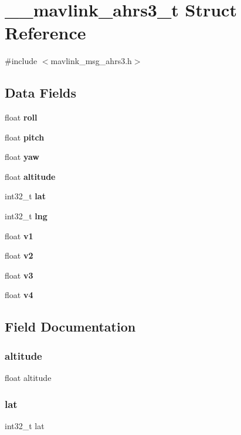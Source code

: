 \section{\+\_\+\+\_\+mavlink\+\_\+ahrs3\+\_\+t Struct Reference}
\label{struct____mavlink__ahrs3__t}


{\ttfamily \#include $<$mavlink\+\_\+msg\+\_\+ahrs3.\+h$>$}

\subsection*{Data Fields}
\begin{DoxyCompactItemize}
\item 
float \textbf{ roll}
\item 
float \textbf{ pitch}
\item 
float \textbf{ yaw}
\item 
float \textbf{ altitude}
\item 
int32\+\_\+t \textbf{ lat}
\item 
int32\+\_\+t \textbf{ lng}
\item 
float \textbf{ v1}
\item 
float \textbf{ v2}
\item 
float \textbf{ v3}
\item 
float \textbf{ v4}
\end{DoxyCompactItemize}


\subsection{Field Documentation}
\mbox{\label{struct____mavlink__ahrs3__t_a0e13a4b4ae0cefdac2a413284239caa6}} 
\subsubsection{altitude}
{\footnotesize\ttfamily float altitude}

\mbox{\label{struct____mavlink__ahrs3__t_a58d1cfb46a8035aadcb0d2b3f178e1ed}} 
\subsubsection{lat}
{\footnotesize\ttfamily int32\+\_\+t lat}

